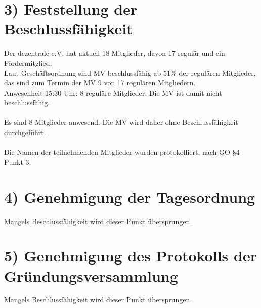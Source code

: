 \documentclass[10pt,a4paper]{scrartcl}
\begin{document}
\section*{3) Feststellung der Beschlussf{\"a}higkeit}
	Der dezentrale e.V. hat aktuell 18 Mitglieder, davon 17 regul{\"a}r und ein F{\"o}rdermitglied.\\
	Laut Gesch{\"a}ftsordnung sind MV beschlussf{\"a}hig ab 51\% der regul{\"a}ren Mitglieder,
	das sind zum Termin der MV 9 von 17 regul{\"a}ren Mitgliedern.\\
	Anwesenheit 15:30 Uhr: 8 regul{\"a}re Mitglieder. Die MV ist damit nicht beschlussf{\"a}hig.\\
\\
	Es sind 8 Mitglieder anwesend. Die MV wird daher ohne Beschlussf{\"a}higkeit durchgef{\"u}hrt.\\
\\
	Die Namen der teilnehmenden Mitglieder wurden protokolliert, nach GO §4 Punkt 3.

\section*{4) Genehmigung der Tagesordnung}
	Mangels Beschlussf{\"a}higkeit wird dieser Punkt {\"u}bersprungen.

\section*{5) Genehmigung des Protokolls der Gr{\"u}ndungsversammlung}
	Mangels Beschlussf{\"a}higkeit wird dieser Punkt {\"u}bersprungen.
\end{document}
